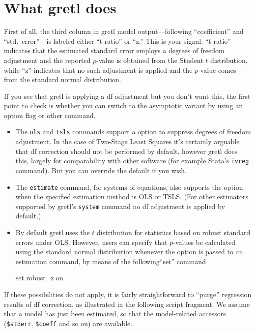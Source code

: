 \section{What gretl does}
\label{sec:df-policy}

First of all, the third column in gretl model output---following
``coefficient'' and ``std.\ error''---is labeled either ``t-ratio'' or
``z.'' This is your signal: ``t-ratio'' indicates that the estimated
standard error employs a degrees of freedom adjustment and the
reported $p$-value is obtained from the Student $t$ distribution,
while ``z'' indicates that no such adjustment is applied and the
$p$-value comes from the standard normal distribution.

If you see that gretl is applying a df adjustment but you don't want
this, the first point to check is whether you can switch to the
asymptotic variant by using an option flag or other command.
\begin{itemize}
\item The \texttt{ols} and \texttt{tsls} commands support a
   option to suppress degrees of freedom
  adjustment. In the case of Two-Stage Least Squares it's certainly
  arguable that df correction should not be performed by default,
  however gretl does this, largely for comparability with other
  software (for example \textsf{Stata}'s \texttt{ivreg} command).  But
  you can override the default if you wish.
\item The \texttt{estimate} command, for systems of equations, also
  supports the  option when the specified
  estimation method is OLS or TSLS. (For other estimators supported by
  gretl's \texttt{system} command no df adjustment is applied by
  default.)
\item By default gretl uses the $t$ distribution for statistics based
  on robust standard errors under OLS. However, users can specify that
  $p$-values be calculated using the standard normal distribution
  whenever the  option is passed to an estimation
  command, by means of the following``set'' command
%
\begin{code}
set robust_z on
\end{code}
\end{itemize}

If these possibilities do not apply, it is fairly straightforward to
``purge'' regression results of df correction, as illustrated in the
following script fragment. We assume that a model has just been
estimated, so that the model-related accessors
(\verb|$stderr|, \verb|$coeff| and so on) are available.
%

